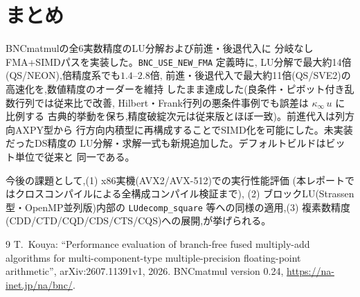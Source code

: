 \documentclass[a4j,dvipdfmx,11pt]{jsarticle}
\begin{document}
\section{まとめ}

BNCmatmulの全6実数精度のLU分解および前進・後退代入に
分岐なしFMA+SIMDパスを実装した。\texttt{BNC\_USE\_NEW\_FMA} 定義時に,
LU分解で最大約14倍(QS/NEON),倍精度系でも$1.4$--$2.8$倍,
前進・後退代入で最大約11倍(QS/SVE2)の高速化を,数値精度のオーダーを維持
したまま達成した(良条件・ピボット付き乱数行列では従来比で改善,
Hilbert・Frank行列の悪条件事例でも誤差は $\kappa_\infty\, u$ に比例する
古典的挙動を保ち,精度破綻次元は従来版とほぼ一致)。前進代入は列方向AXPY型から
行方向内積型に再構成することでSIMD化を可能にした。未実装だったDS精度の
LU分解・求解一式も新規追加した。デフォルトビルドはビット単位で従来と
同一である。

今後の課題として,(1) x86実機(AVX2/AVX-512)での実行性能評価
(本レポートではクロスコンパイルによる全構成コンパイル検証まで),
(2) ブロックLU(Strassen型・OpenMP並列版)内部の
\texttt{LUdecomp\_square} 等への同様の適用,(3) 複素数精度
(CDD/CTD/CQD/CDS/CTS/CQS)への展開,が挙げられる。

\begin{thebibliography}{9}
T.~Kouya:
``Performance evaluation of branch-free fused multiply-add algorithms
for multi-component-type multiple-precision floating-point arithmetic'',
arXiv:2607.11391v1, 2026.
BNCmatmul version 0.24, \url{https://na-inet.jp/na/bnc/}.
\end{thebibliography}
\end{document}
